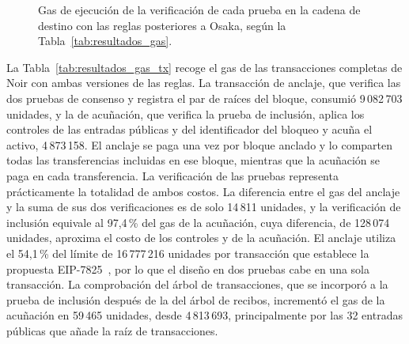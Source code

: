 \begin{figure}[htbp]
	\centering
	\caption[Gas de ejecución de la verificación de cada prueba.]{Gas de ejecución de la
	verificación de cada prueba en la cadena de destino con las reglas posteriores a Osaka, según la
	Tabla~\ref{tab:resultados_gas}.}
	\label{fig:resultados_gas}
\end{figure}

La Tabla~\ref{tab:resultados_gas_tx} recoge el gas de las transacciones completas de Noir con
ambas versiones de las reglas. La transacción de anclaje, que verifica las dos pruebas de consenso y
registra el par de raíces del bloque, consumió 9\,082\,703 unidades, y la de acuñación, que verifica la
prueba de inclusión, aplica los controles de las entradas públicas y del identificador del bloqueo
y acuña el activo, 4\,873\,158. El anclaje se paga una vez por bloque anclado y lo comparten todas
las transferencias incluidas en ese bloque, mientras que la acuñación se paga en cada
transferencia. La verificación de las pruebas representa prácticamente la totalidad de ambos
costos. La diferencia entre el gas del anclaje y la suma de sus dos verificaciones es de solo
14\,811 unidades, y la verificación de inclusión equivale al 97,4\,\% del gas de la acuñación, cuya
diferencia, de 128\,074 unidades, aproxima el costo de los controles y de la acuñación. El anclaje
utiliza el 54,1\,\% del límite de 16\,777\,216 unidades por transacción que establece la propuesta
EIP-7825~\cite{eip7825}, por lo que el diseño en dos pruebas cabe en una sola transacción. La comprobación del árbol de
transacciones, que se incorporó a la prueba de inclusión después de la del árbol de recibos,
incrementó el gas de la acuñación en 59\,465 unidades, desde 4\,813\,693, principalmente por las
32 entradas públicas que añade la raíz de transacciones.

